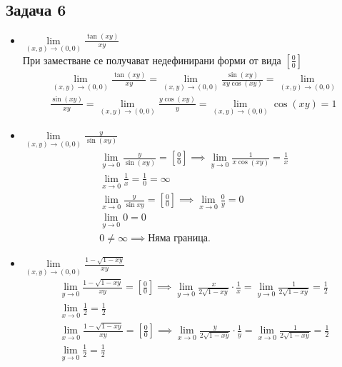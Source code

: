 \documentclass[a4paper,fleqn,12pt]{article}
\theoremstyle{definition}
\begin{document}
\subsection*{Задача 6}
\begin{itemize}
\item $\lim\limits_{(x,y) \to (0,0)} \frac{\tan(xy)}{xy}$\\
При заместване се получават недефинирани форми от вида $\left[ \frac{0}{0}\right]$
\begin{gather*}
\lim\limits_{(x,y) \to (0,0)} \frac{\tan(xy)}{xy} = \lim\limits_{(x,y) \to (0,0)} \frac{\sin(xy)}{xy\cos(xy)} = \lim\limits_{(x,y) \to (0,0)} \\
\frac{\sin(xy)}{xy} =  \lim\limits_{(x,y) \to (0,0)} \frac{y\cos(xy)}{y} =  \lim\limits_{(x,y) \to (0,0)} \cos(xy) = 1
\end{gather*}
\item $\lim\limits_{(x,y) \to (0,0)} \frac{y}{\sin(xy)}$\\
\begin{gather*}
\lim\limits_{y \to 0} \frac{y}{\sin(xy)} = \left[ \frac{0}{0} \right] \implies \lim\limits_{y \to 0} \frac{1}{x\cos(xy)} = \frac{1}{x} \\
\lim\limits_{x \to 0} \frac{1}{x} = \frac{1}{0} = \infty \\
\lim\limits_{x \to 0} \frac{y}{\sin{xy}} = \left[ \frac{0}{0} \right] \implies \lim\limits_{x \to 0} \frac{0}{y} = 0 \\
\lim\limits_{y \to 0} 0 = 0 \\
0 \neq \infty \implies \text{Няма граница.}
\end{gather*} 
\item $\lim\limits_{(x,y) \to (0,0)} \frac{1 - \sqrt{1 - xy}}{xy}$
\begin{gather*}
\lim\limits_{y \to 0} \frac{1 - \sqrt{1 - xy}}{xy} = \left[ \frac{0}{0} \right] \implies 
\lim\limits_{y \to 0} \frac{x}{2\sqrt{1-xy}} \cdot \frac{1}{x} = \lim\limits_{y \to 0} \frac{1}{2\sqrt{1-xy}} = \frac{1}{2} \\
\lim\limits_{x \to 0} \frac{1}{2} = \frac{1}{2}\\
\lim\limits_{x \to 0} \frac{1 - \sqrt{1 - xy}}{xy} = \left[ \frac{0}{0} \right] \implies 
\lim\limits_{x \to 0} \frac{y}{2\sqrt{1-xy}} \cdot \frac{1}{y} = \lim\limits_{x \to 0} \frac{1}{2\sqrt{1-xy}} = \frac{1}{2} \\
\lim\limits_{y \to 0} \frac{1}{2} = \frac{1}{2}
\end{gather*}
\end{itemize}
\end{document}
